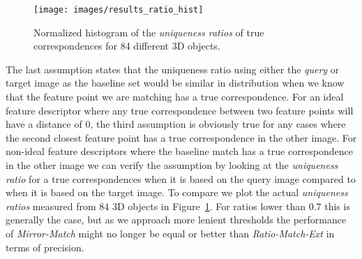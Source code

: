\documentclass[journal]{IEEEtran}
\begin{document}
\begin{figure}[t]
\centering
\texttt{[image: images/results\_ratio\_hist]}
\caption{Normalized histogram of the \emph{uniqueness ratios} of true 
correspondences for 84 different 3D objects.}
\label{fig:ratio_hist}
\end{figure}

The last assumption states that the uniqueness ratio using either the 
\emph{query} or target image as the baseline set would be similar
in distribution when we know that the feature point we are matching has 
a true correspondence. For an ideal feature descriptor where any true 
correspondence between two feature points will have a distance of $0$, 
the third assumption is obviously true for any cases where the second 
closest feature point has a true correspondence in the other image. For 
non-ideal feature descriptors where the baseline match has a true 
correspondence in the other image we can verify the assumption by 
looking at the \emph{uniqueness ratio} for a true correspondences when 
it is based on the query image compared to when it is based on the 
target image. To compare we plot the actual \emph{uniqueness ratios} 
measured from $84$ 3D objects in Figure~\ref{fig:ratio_hist}. For ratios 
lower than $0.7$ this is generally the case, but as we approach more 
lenient thresholds the performance of \emph{Mirror-Match} might no 
longer be equal or better than \emph{Ratio-Match-Ext} in terms of 
precision.
\end{document}
